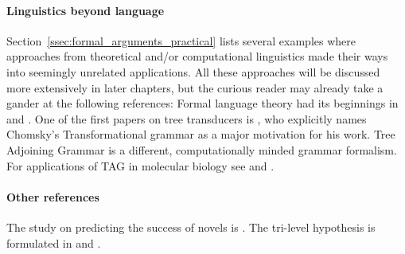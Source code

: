 \begin{literature}
\paragraph{Linguistics beyond language}
Section~\ref{ssec:formal_arguments_practical} lists several examples where approaches from theoretical and\slash or computational linguistics made their ways into seemingly unrelated applications.
All these approaches will be discussed more extensively in later chapters, but the curious reader may already take a gander at the following references:
Formal language theory had its beginnings in \citet{Chomsky57,Chomsky59} and \citet{ChomskySchuetzenberger63}.
One of the first papers on tree transducers is \citet{Rounds70}, who explicitly names Chomsky's Transformational grammar as a major motivation for his work.
Tree Adjoining Grammar \citep{Joshi85} is a different, computationally minded grammar formalism.
For applications of TAG in molecular biology see \citet{Uemura.etal99} and \citet{Matsui.etal05}.

\paragraph{Other references}
The study on predicting the success of novels is \citet{AshokEtAl13}.
The tri-level hypothesis is formulated in \citet{MarrPoggio76} and \citet{Marr82}.
\end{literature}


